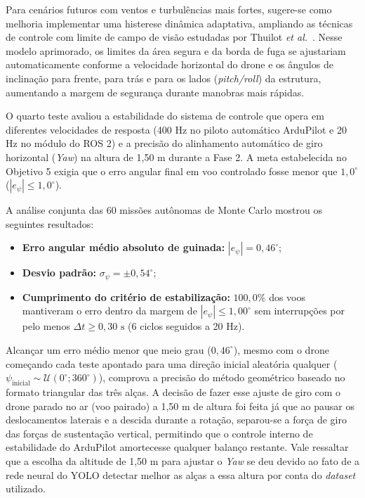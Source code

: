 Para cenários futuros com ventos e turbulências mais fortes, sugere-se como melhoria implementar uma histerese dinâmica adaptativa, ampliando as técnicas de controle com limite de campo de visão estudadas por Thuilot \textit{et al.}~\cite{thuilot2002}. Nesse modelo aprimorado, os limites da área segura e da borda de fuga se ajustariam automaticamente conforme a velocidade horizontal do drone e os ângulos de inclinação para frente, para trás e para os lados (\textit{pitch/roll}) da estrutura, aumentando a margem de segurança durante manobras mais rápidas.


O quarto teste avaliou a estabilidade do sistema de controle que opera em diferentes velocidades de resposta (400 Hz no piloto automático ArduPilot e 20 Hz no módulo do ROS 2) e a precisão do alinhamento automático de giro horizontal (\textit{Yaw}) na altura de 1,50 m durante a Fase 2. A meta estabelecida no Objetivo 5 exigia que o erro angular final em voo controlado fosse menor que $1{,}0^\circ$ ($|e_\psi| \le 1{,}0^\circ$).

A análise conjunta das 60 missões autônomas de Monte Carlo mostrou os seguintes resultados:
\begin{itemize}
	\item \textbf{Erro angular médio absoluto de guinada:} $|e_\psi| = 0{,}46^\circ$;
	\item \textbf{Desvio padrão:} $\sigma_\psi = \pm 0{,}54^\circ$;
	\item \textbf{Cumprimento do critério de estabilização:} $100{,}0\%$ dos voos mantiveram o erro dentro da margem de $|e_\psi| \le 1{,}00^\circ$ sem interrupções por pelo menos $\Delta t \ge 0{,}30\text{ s}$ (6 ciclos seguidos a 20 Hz).
\end{itemize}


Alcançar um erro médio menor que meio grau ($0{,}46^\circ$), mesmo com o drone começando cada teste apontado para uma direção inicial aleatória qualquer ($\psi_{\text{inicial}} \sim \mathcal{U}(0^\circ; 360^\circ)$), comprova a precisão do método geométrico baseado no formato triangular das três alças. A decisão de fazer esse ajuste de giro com o drone parado no ar (voo pairado) a 1,50 m de altura foi feita já que ao pausar os deslocamentos laterais e a descida durante a rotação, separou-se a força de giro das forças de sustentação vertical, permitindo que o controle interno de estabilidade do ArduPilot amortecesse qualquer balanço restante. Vale ressaltar que a escolha da altitude de 1,50 m para ajustar o \textit{Yaw} se deu devido ao fato de a rede neural do YOLO detectar melhor as alças a essa altura por conta do \textit{dataset} utilizado.

